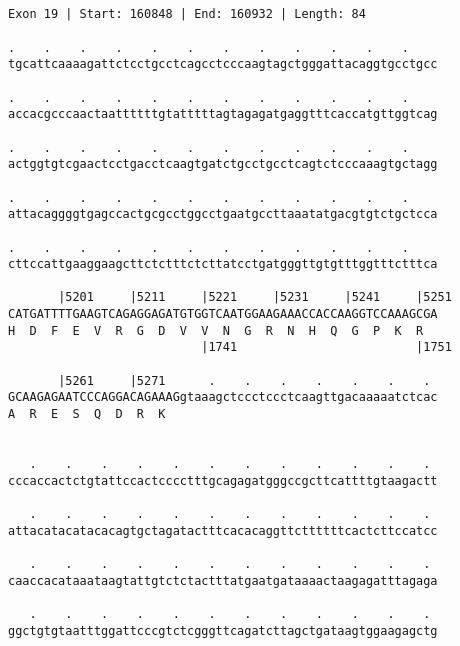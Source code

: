 \documentclass{article}
\begin{document}
\begin{Verbatim}
                                         
 
Exon 19 | Start: 160848 | End: 160932 | Length: 84
 
.    .    .    .    .    .    .    .    .    .    .    .    
tgcattcaaaagattctcctgcctcagcctcccaagtagctgggattacaggtgcctgcc
                                                            
.    .    .    .    .    .    .    .    .    .    .    .    
accacgcccaactaattttttgtatttttagtagagatgaggtttcaccatgttggtcag
                                                            
.    .    .    .    .    .    .    .    .    .    .    .    
actggtgtcgaactcctgacctcaagtgatctgcctgcctcagtctcccaaagtgctagg
                                                            
.    .    .    .    .    .    .    .    .    .    .    .    
attacaggggtgagccactgcgcctggcctgaatgccttaaatatgacgtgtctgctcca
                                                            
.    .    .    .    .    .    .    .    .    .    .    .    
cttccattgaaggaagcttctctttctcttatcctgatgggttgtgtttggtttctttca
                                                            
       |5201     |5211     |5221     |5231     |5241     |5251
CATGATTTTGAAGTCAGAGGAGATGTGGTCAATGGAAGAAACCACCAAGGTCCAAAGCGA
H  D  F  E  V  R  G  D  V  V  N  G  R  N  H  Q  G  P  K  R  
                           |1741                         |1751
  
       |5261     |5271      .    .    .    .    .    .    . 
GCAAGAGAATCCCAGGACAGAAAGgtaaagctccctccctcaagttgacaaaaatctcac
A  R  E  S  Q  D  R  K                                      
                                                            
  
   .    .    .    .    .    .    .    .    .    .    .    . 
cccaccactctgtattccactcccctttgcagagatgggccgcttcattttgtaagactt
                                                            
   .    .    .    .    .    .    .    .    .    .    .    . 
attacatacatacacagtgctagatactttcacacaggttcttttttcactcttccatcc
                                                            
   .    .    .    .    .    .    .    .    .    .    .    . 
caaccacataaataagtattgtctctactttatgaatgataaaactaagagatttagaga
                                                            
   .    .    .    .    .    .    .    .    .    .    .    . 
ggctgtgtaatttggattcccgtctcgggttcagatcttagctgataagtggaagagctg
                                                            

\end{Verbatim}
\end{document}
